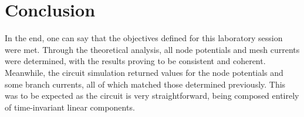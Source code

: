 \section{Conclusion}
\label{sec:conclusion}

\par
In the end, one can say that the objectives defined for this laboratory session were met.
Through the theoretical analysis, all node potentials and mesh currents were determined, with the results proving to be consistent and coherent.
Meanwhile, the circuit simulation returned values for the node potentials and some branch currents, all of which matched those determined previously. This was to be expected as the circuit is very straightforward, being composed entirely of time-invariant linear components.

